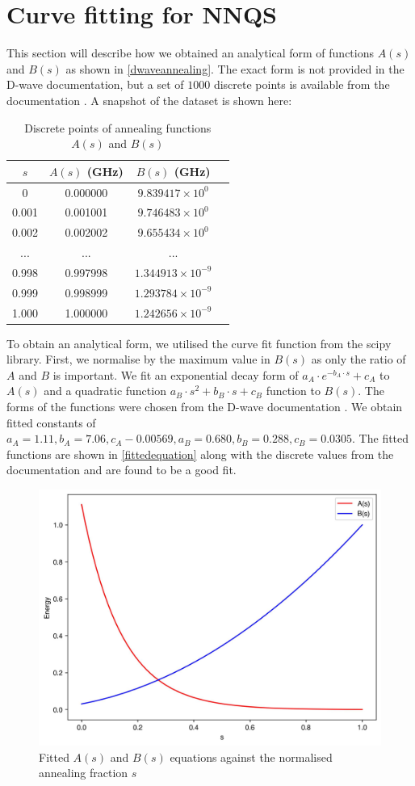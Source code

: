 \chapter{Curve fitting for NNQS}\label{appendix:curvefitting}
This section will describe how we obtained an analytical form of functions $A(s)$ and $B(s)$ as shown in \autoref{dwaveannealing}. The exact form is not provided in the D-wave documentation, but a set of $1000$ discrete points is available from the documentation \cite{dwavefunctions}. A snapshot of the dataset is shown here:
\begin{table}[!h]
    \centering
    \begin{tabular}{cccc}
    \hline
    $s$ & $A(s)$ (GHz) & $B(s)$ (GHz)\\
    \hline
    0 & 0.000000 & $9.839417 \times 10^0$ \\
    0.001 & 0.001001 & $9.746483 \times 10^0$ \\
    0.002 & 0.002002 & $9.655434 \times 10^0$ \\
    ... & ... & ... \\
    0.998 & 0.997998 & $1.344913 \times 10^{-9}$\\
    0.999 & 0.998999 & $1.293784 \times 10^{-9}$\\
    1.000 & 1.000000 & $1.242656 \times 10^{-9}$\\
    \hline
    \end{tabular}
    \caption{Discrete points of annealing functions $A(s)$ and $B(s)$}
    \label{tab:dwavefunction}
\end{table}

To obtain an analytical form, we utilised the curve fit function from the scipy library. First, we normalise by the maximum value in $B(s)$ as only the ratio of $A$ and $B$ is important. We fit an exponential decay form of $a_{A}\cdot e^{-b_{A}\cdot s} + c_{A}$ to $A(s)$ and a quadratic function $a_{B} \cdot s^2 + b_{B} \cdot s + c_{B}$ function to $B(s)$. The forms of the functions were chosen from the D-wave documentation \cite{dwavefunctions}. We obtain fitted constants of $a_{A}=1.11, b_{A} = 7.06, c_A-0.00569, a_B = 0.680, b_B = 0.288, c_B = 0.0305$. The fitted functions are shown in \autoref{fittedequation} along with the discrete values from the documentation and are found to be a good fit.
\begin{figure}[!h]
    \centering
    \includegraphics[width=0.6\linewidth]{images/fitted.jpg}
    \caption{Fitted $A(s)$ and $B(s)$ equations against the normalised annealing fraction $s$}
    \label{fittedequation}
\end{figure}